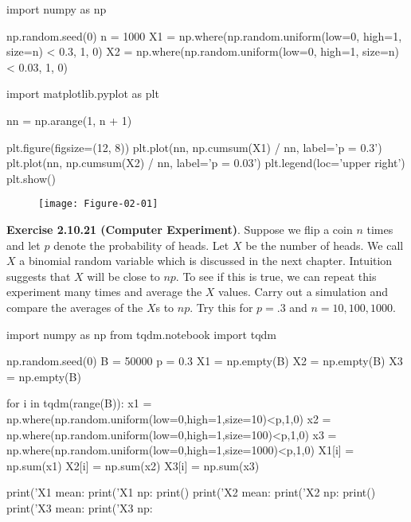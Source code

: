 \begin{python}
import numpy as np

np.random.seed(0)
n = 1000
X1 = np.where(np.random.uniform(low=0, high=1, size=n) < 0.3, 1, 0) 
X2 = np.where(np.random.uniform(low=0, high=1, size=n) < 0.03, 1, 0) 
\end{python}

\begin{python}
import matplotlib.pyplot as plt

nn = np.arange(1, n + 1)

plt.figure(figsize=(12, 8))
plt.plot(nn, np.cumsum(X1) / nn, label='p = 0.3')
plt.plot(nn, np.cumsum(X2) / nn, label='p = 0.03')
plt.legend(loc='upper right')
plt.show()
\end{python}

\begin{figure}[H]
\centering
\texttt{[image: Figure-02-01]}
\end{figure}

\textbf{Exercise 2.10.21 (Computer Experiment)}. Suppose we flip a coin \(n\) times and let \(p\) denote the probability of heads. Let \(X\) be the number of heads. We call \(X\) a binomial random variable which is discussed in the next chapter. Intuition suggests that \(X\) will be close to \(np\). To see if this is true, we can repeat this experiment many times and average the \(X\) values. Carry out a simulation and compare the averages of the \(X\)s to \(np\). Try this for \(p = .3\) and \(n = 10, 100, 1000\).

\begin{python}
import numpy as np
from tqdm.notebook import tqdm

np.random.seed(0)
B = 50000
p = 0.3
X1 = np.empty(B)
X2 = np.empty(B)
X3 = np.empty(B)

for i in tqdm(range(B)):
    x1 = np.where(np.random.uniform(low=0,high=1,size=10)<p,1,0)
    x2 = np.where(np.random.uniform(low=0,high=1,size=100)<p,1,0)
    x3 = np.where(np.random.uniform(low=0,high=1,size=1000)<p,1,0)
    X1[i] = np.sum(x1)
    X2[i] = np.sum(x2)
    X3[i] = np.sum(x3)
\end{python}

\begin{python}
print('X1 mean: %
print('X1 np:   %
print()
print('X2 mean: %
print('X2 np:   %
print()
print('X3 mean: %
print('X3 np:   %
\end{python}

